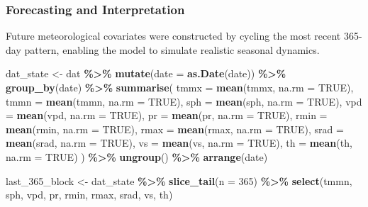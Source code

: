 \documentclass[
]{article}
\newenvironment{Shaded}{\begin{snugshade}}{\end{snugshade}}
\newcommand{\AttributeTok}[1]{\textcolor[rgb]{0.13,0.29,0.53}{#1}}
\newcommand{\ConstantTok}[1]{\textcolor[rgb]{0.56,0.35,0.01}{#1}}
\newcommand{\DecValTok}[1]{\textcolor[rgb]{0.00,0.00,0.81}{#1}}
\newcommand{\FunctionTok}[1]{\textcolor[rgb]{0.13,0.29,0.53}{\textbf{#1}}}
\newcommand{\NormalTok}[1]{#1}
\newcommand{\OtherTok}[1]{\textcolor[rgb]{0.56,0.35,0.01}{#1}}
\newcommand{\SpecialCharTok}[1]{\textcolor[rgb]{0.81,0.36,0.00}{\textbf{#1}}}
\begin{document}
\subsubsection{Forecasting and
Interpretation}\label{forecasting-and-interpretation-1}

Future meteorological covariates were constructed by cycling the most
recent 365-day pattern, enabling the model to simulate realistic
seasonal dynamics.

\begin{Shaded}
\begin{Highlighting}[]
\NormalTok{dat\_state }\OtherTok{\textless{}{-}}\NormalTok{ dat }\SpecialCharTok{\%\textgreater{}\%}
  \FunctionTok{mutate}\NormalTok{(}\AttributeTok{date =} \FunctionTok{as.Date}\NormalTok{(date)) }\SpecialCharTok{\%\textgreater{}\%}
  \FunctionTok{group\_by}\NormalTok{(date) }\SpecialCharTok{\%\textgreater{}\%}
  \FunctionTok{summarise}\NormalTok{(}
    \AttributeTok{tmmx =} \FunctionTok{mean}\NormalTok{(tmmx, }\AttributeTok{na.rm =} \ConstantTok{TRUE}\NormalTok{),}
    \AttributeTok{tmmn =} \FunctionTok{mean}\NormalTok{(tmmn, }\AttributeTok{na.rm =} \ConstantTok{TRUE}\NormalTok{),}
    \AttributeTok{sph  =} \FunctionTok{mean}\NormalTok{(sph,  }\AttributeTok{na.rm =} \ConstantTok{TRUE}\NormalTok{),}
    \AttributeTok{vpd  =} \FunctionTok{mean}\NormalTok{(vpd,  }\AttributeTok{na.rm =} \ConstantTok{TRUE}\NormalTok{),}
    \AttributeTok{pr   =} \FunctionTok{mean}\NormalTok{(pr,   }\AttributeTok{na.rm =} \ConstantTok{TRUE}\NormalTok{),}
    \AttributeTok{rmin =} \FunctionTok{mean}\NormalTok{(rmin, }\AttributeTok{na.rm =} \ConstantTok{TRUE}\NormalTok{),}
    \AttributeTok{rmax =} \FunctionTok{mean}\NormalTok{(rmax, }\AttributeTok{na.rm =} \ConstantTok{TRUE}\NormalTok{),}
    \AttributeTok{srad =} \FunctionTok{mean}\NormalTok{(srad, }\AttributeTok{na.rm =} \ConstantTok{TRUE}\NormalTok{),}
    \AttributeTok{vs   =} \FunctionTok{mean}\NormalTok{(vs,   }\AttributeTok{na.rm =} \ConstantTok{TRUE}\NormalTok{),}
    \AttributeTok{th   =} \FunctionTok{mean}\NormalTok{(th,   }\AttributeTok{na.rm =} \ConstantTok{TRUE}\NormalTok{)}
\NormalTok{  ) }\SpecialCharTok{\%\textgreater{}\%}
  \FunctionTok{ungroup}\NormalTok{() }\SpecialCharTok{\%\textgreater{}\%}
  \FunctionTok{arrange}\NormalTok{(date)}

\NormalTok{last\_365\_block }\OtherTok{\textless{}{-}}\NormalTok{ dat\_state }\SpecialCharTok{\%\textgreater{}\%}
  \FunctionTok{slice\_tail}\NormalTok{(}\AttributeTok{n =} \DecValTok{365}\NormalTok{) }\SpecialCharTok{\%\textgreater{}\%}
  \FunctionTok{select}\NormalTok{(tmmn, sph, vpd, pr, rmin, rmax, srad, vs, th)}



\end{Highlighting}
\end{Shaded}
\end{document}
